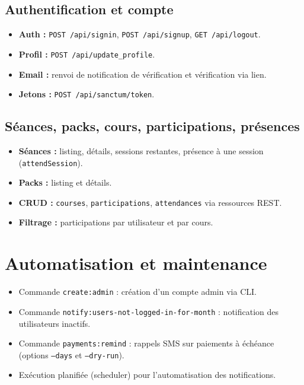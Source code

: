 \documentclass[12pt, a4paper]{article}
\begin{document}
\subsection{Authentification et compte}
\begin{itemize}
    \item \textbf{Auth :} \texttt{POST /api/signin}, \texttt{POST /api/signup}, \texttt{GET /api/logout}.
    \item \textbf{Profil :} \texttt{POST /api/update\_profile}.
    \item \textbf{Email :} renvoi de notification de vérification et vérification via lien.
    \item \textbf{Jetons :} \texttt{POST /api/sanctum/token}.
\end{itemize}

\subsection{Séances, packs, cours, participations, présences}
\begin{itemize}
    \item \textbf{Séances :} listing, détails, sessions restantes, présence à une session (\texttt{attendSession}).
    \item \textbf{Packs :} listing et détails.
    \item \textbf{CRUD :} \texttt{courses}, \texttt{participations}, \texttt{attendances} via ressources REST.
    \item \textbf{Filtrage :} participations par utilisateur et par cours.
\end{itemize}

\section{Automatisation et maintenance}
\begin{itemize}
    \item Commande \texttt{create:admin} : création d'un compte admin via CLI.
    \item Commande \texttt{notify:users-not-logged-in-for-month} : notification des utilisateurs inactifs.
    \item Commande \texttt{payments:remind} : rappels SMS sur paiements à échéance (options \texttt{--days} et \texttt{--dry-run}).
    \item Exécution planifiée (scheduler) pour l'automatisation des notifications.
\end{itemize}
\end{document}
